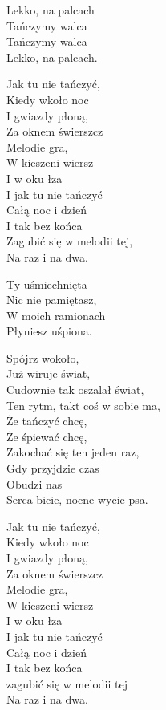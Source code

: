 \begin{text}
    Lekko, na palcach\\
    Tańczymy walca\\
    Tańczymy walca\\
    Lekko, na palcach.

    Jak tu nie tańczyć,\\
    Kiedy wkoło noc\\
    I gwiazdy płoną,\\
    Za oknem świerszcz\\
    Melodie gra,\\
    W kieszeni wiersz\\
    I w oku łza\\
    I jak tu nie tańczyć\\
    Całą noc i dzień\\
    I tak bez końca\\
    Zagubić się w melodii tej,\\
    Na raz i na dwa.

    Ty uśmiechnięta\\
    Nic nie pamiętasz,\\
    W moich ramionach\\
    Płyniesz uśpiona.

    Spójrz wokoło,\\
    Już wiruje świat,\\
    Cudownie tak oszalał świat,\\
    Ten rytm, takt coś w sobie ma,\\
    Że tańczyć chcę,\\
    Że śpiewać chcę,\\
    Zakochać się ten jeden raz,\\
    Gdy przyjdzie czas\\
    Obudzi nas\\
    Serca bicie, nocne wycie psa.

    Jak tu nie tańczyć,\\
    Kiedy wkoło noc\\
    I gwiazdy płoną,\\
    Za oknem świerszcz\\
    Melodie gra,\\
    W kieszeni wiersz\\
    I w oku łza\\
    I jak tu nie tańczyć\\
    Całą noc i dzień\\
    I tak bez końca\\
    zagubić się w melodii tej\\
    Na raz i na dwa.
\end{text}
\begin{chord}

\end{chord}